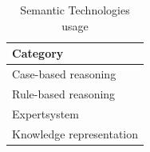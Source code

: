         
            \begin{table}[H]
                \centering
        	    {
        	    \begin{tabular}{ | m{14.5cm} | }
                    \hline
                    \rowcolor{teal!30} Category \\
                    
                    \hline
                    Case-based reasoning\\
                    
                    \hline
                    Rule-based reasoning\\
                    
                    \hline
                    Expertsystem\\
                    
                    \hline
                    Knowledge representation\\
                    
                    \hline
                \end{tabular}}
                \caption{\label{tab:sem-tec-usage} Semantic Technologies usage}
            \end{table}

